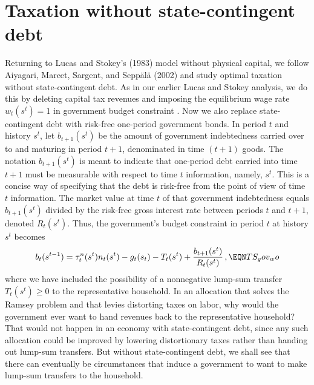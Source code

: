 \section{Taxation without state-contingent debt}\label{sec:AMSS}%
Returning to Lucas and Stokey's (1983) model without physical capital,
we follow Aiyagari, Marcet, Sargent, and Sepp\"al\"a (2002)
and study optimal taxation without state-contingent debt.
As in our earlier Lucas and Stokey analysis, we do this by deleting
capital tax revenues and imposing the equilibrium wage rate
$w_t(s^t)=1$ in government budget constraint . Now we also  replace
state-contingent debt with risk-free one-period government bonds. In period $t$
and history $s^t$, let $b_{t+1}(s^t)$ be the amount of government indebtedness
carried over to and maturing in period $t+1$, denominated in time $(t+1)$ goods. The notation $b_{t+1}(s^t)$  is meant
to indicate that one-period debt carried into time $t+1$ must be measurable with respect to time $t$ information, namely, $s^t$.
This is a concise way of specifying that the debt is risk-free from the point of view of time $t$ information. The
market value at time $t$ of that government indebtedness equals
$b_{t+1}(s^t)$ divided by the risk-free gross interest rate between periods $t$
and $t+1$, denoted  $R_t(s^t)$.  Thus,
the government's budget constraint in period $t$ at history $s^t$ becomes
$$
 b_t(s^{t-1}) =    \tau^n_t(s^t) n_t(s^t) - g_t(s_t) - T_t(s^t)
                    + {b_{t+1}(s^t) \over R_t(s^t )}\,,
              \EQN TS_gov_wo
$$
where we have included the possibility of a nonnegative lump-sum
transfer $T_t(s^t) \geq 0 $ to the representative household.
 In an  allocation that solves the Ramsey problem and  that
levies distorting  taxes on labor, why would the government ever want to
   hand revenues back to the representative household? That would not  happen in an economy
with state-contingent debt, since any such allocation could be improved
by lowering distortionary taxes rather than handing out lump-sum
transfers. But  without state-contingent debt, we shall see that   there
can eventually be circumstances that induce  a government to want to make lump-sum
transfers to the household.

